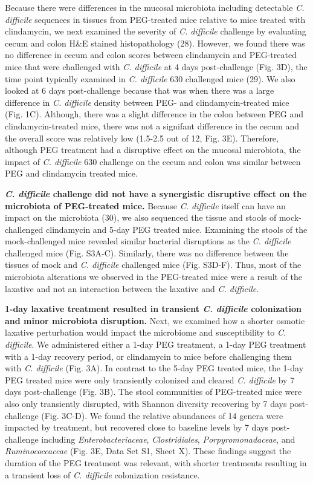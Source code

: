 \documentclass[
  11pt,
]{article}
\begin{document}
Because there were differences in the mucosal microbiota including
detectable \emph{C. difficile} sequences in tissues from PEG-treated
mice relative to mice treated with clindamycin, we next examined the
severity of \emph{C. difficile} challenge by evaluating cecum and colon
H\&E stained histopathology (28). However, we found there was no
difference in cecum and colon scores between clindamycin and PEG-treated
mice that were challenged with \emph{C. difficile} at 4 days
post-challenge (Fig. 3D), the time point typically examined in \emph{C.
difficile} 630 challenged mice (29). We also looked at 6 days
post-challenge because that was when there was a large difference in
\emph{C. difficile} density between PEG- and clindamycin-treated mice
(Fig. 1C). Although, there was a slight difference in the colon between
PEG and clindamycin-treated mice, there was not a signifant difference
in the cecum and the overall score was relatively low (1.5-2.5 out of
12, Fig. 3E). Therefore, although PEG treatment had a disruptive effect
on the mucosal microbiota, the impact of \emph{C. difficile} 630
challenge on the cecum and colon was similar between PEG and clindamycin
treated mice.

\textbf{\emph{C. difficile} challenge did not have a synergistic
disruptive effect on the microbiota of PEG-treated mice.} Because
\emph{C. difficile} itself can have an impact on the microbiota (30), we
also sequenced the tissue and stools of mock-challenged clindamycin and
5-day PEG treated mice. Examining the stools of the mock-challenged mice
revealed similar bacterial disruptions as the \emph{C. difficile}
challenged mice (Fig. S3A-C). Similarly, there was no difference between
the tissues of mock and \emph{C. difficile} challenged mice (Fig.
S3D-F). Thus, most of the microbiota alterations we observed in the
PEG-treated mice were a result of the laxative and not an interaction
between the laxative and \emph{C. difficile}.

\textbf{1-day laxative treatment resulted in transient \emph{C.
difficile} colonization and minor microbiota disruption.} Next, we
examined how a shorter osmotic laxative perturbation would impact the
microbiome and susceptibility to \emph{C. difficile}. We administered
either a 1-day PEG treatment, a 1-day PEG treatment with a 1-day
recovery period, or clindamycin to mice before challenging them with
\emph{C. difficile} (Fig. 3A). In contrast to the 5-day PEG treated
mice, the 1-day PEG treated mice were only transiently colonized and
cleared \emph{C. difficile} by 7 days post-challenge (Fig. 3B). The
stool communities of PEG-treated mice were also only transiently
disrupted, with Shannon diversity recovering by 7 days post-challenge
(Fig. 3C-D). We found the relative abundances of 14 genera were impacted
by treatment, but recovered close to baseline levels by 7 days
post-challenge including \emph{Enterobacteriaceae},
\emph{Clostridiales}, \emph{Porpyromonadaceae}, and
\emph{Ruminococcaceae} (Fig. 3E, Data Set S1, Sheet X). These findings
suggest the duration of the PEG treatment was relevant, with shorter
treatments resulting in a transient loss of \emph{C. difficile}
colonization resistance.
\end{document}
